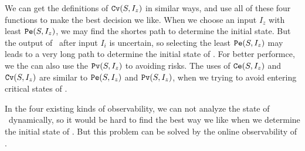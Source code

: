 We can get the definitions of ${\tt Cv}(S, I_z)$ in similar ways, and use all of these four functions to make the best decision we like. When we choose an input $I_z$ with least ${\tt Pe}(S, I_z)$, we may find the shortes path to determine the initial state. But the output of \BCNs\ after input $I_i$ is uncertain, so selecting the least ${\tt Pe}(S, I_z)$ may leads to a very long path to determine the initial state of \BCNs. For better performce, we the can also use the ${\tt Pv}(S, I_z)$ to avoiding risks. The uses of ${\tt Ce}(S, I_z)$ and ${\tt Cv}(S, I_z)$ are similar to ${\tt Pe}(S, I_z)$ and ${\tt Pv}(S, I_z)$, when we trying to avoid entering critical states of \BCNs.

In the four existing kinds of observability, we can not analyze the state of \BCNs\ dynamically, so it would be hard to find the best way we like when we determine the initial state of \BCNs. But this problem can be solved by the online observability of \BCNs.